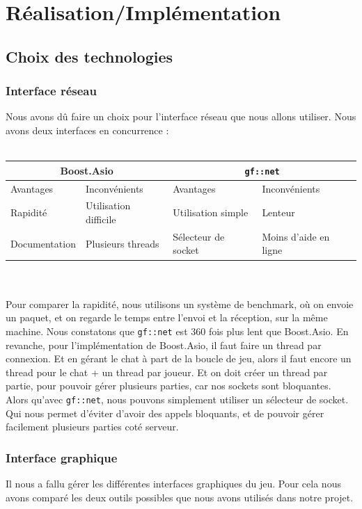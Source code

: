 \documentclass[a4paper, 12pt, twoside]{article}
\begin{document}
\newpage
\section{Réalisation/Implémentation}

\subsection{Choix des technologies}

\subsubsection{Interface réseau}
Nous avons dû faire un choix pour l'interface réseau que nous allons utiliser. Nous avons deux interfaces en concurrence :\\ \\
\begin{tabular}{ | l | l | l | l | }
    \hline
    \multicolumn{2}{|c|}{Boost.Asio} & \multicolumn{2}{|c|}{\verb!gf::net!}\\
    \hline
    Avantages & Inconvénients & Avantages & Inconvénients\\
    \hline
    Rapidité & Utilisation difficile & Utilisation simple & Lenteur\\
	\hline
	Documentation & Plusieurs threads & Sélecteur de socket & Moins d'aide en ligne\\
	\hline
\end{tabular} \\ \\
Pour comparer la rapidité, nous utilisons un système de benchmark, où on envoie un paquet, et on regarde le temps entre l'envoi et la réception, sur la même machine. Nous constatons que \verb!gf::net! est 360 fois plus lent que Boost.Asio. En revanche, pour l'implémentation de Boost.Asio, il faut faire un thread par connexion. Et en gérant le chat à part de la boucle de jeu, alors il faut encore un thread pour le chat + un thread par joueur. Et on doit créer un thread par partie, pour pouvoir gérer plusieurs parties, car nos sockets sont bloquantes. Alors qu'avec \verb!gf::net!, nous pouvons simplement utiliser un sélecteur de socket. Qui nous permet d'éviter d'avoir des appels bloquants, et de pouvoir gérer facilement plusieurs parties coté serveur.

\subsubsection{Interface graphique}
Il nous a fallu gérer les différentes interfaces
graphiques du jeu. Pour cela nous avons comparé les deux outils possibles que nous avons utilisés dans notre projet.\\
\end{document}
